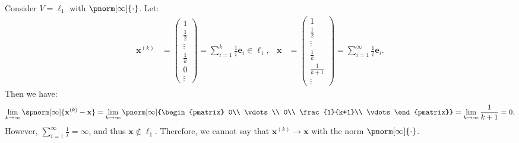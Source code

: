 \documentclass{huhtakm-template-book-v2}
\begin{document}
    \begin{eg}
        Consider $V = \ell_{1}$ with $\pnorm[\infty]{\cdot}$. Let:
        \begin{align*}
            \mathbf{x}^{(k)} &= \begin{pmatrix}
                1\\
                \frac{1}{2}\\
                \vdots\\
                \frac{1}{k}\\
                0\\
                \vdots
            \end{pmatrix}=\sum_{i=1}^{k}\frac{1}{i}\mathbf{e}_{i} \in \ell_{1}, & \mathbf{x} &= \begin{pmatrix}
                1\\
                \frac{1}{2}\\
                \vdots\\
                \frac{1}{k}\\
                \frac{1}{k+1}\\
                \vdots
            \end{pmatrix}=\sum_{i=1}^{\infty}\frac{1}{i}\mathbf{e}_{i}.
        \end{align*}
        Then we have:
        \begin{align*}
            \lim_{k \to \infty}\spnorm[\infty]{\mathbf{x}^{(k)} - \mathbf{x}} = \lim_{k \to \infty}\pnorm[\infty]{\begin{pmatrix}
                    0\\
                    \vdots\\
                    0\\
                    \frac{1}{k+1}\\
                    \vdots
            \end{pmatrix}} = \lim_{k \to \infty}\frac{1}{k+1} = 0.
        \end{align*}
        However, $\sum_{i=1}^{\infty}\frac{1}{i} = \infty$, and thus $\mathbf{x} \not\in \ell_{1}$. Therefore, we cannot say that $\mathbf{x}^{(k)} \to \mathbf{x}$ with the norm $\pnorm[\infty]{\cdot}$.
    \end{eg}
    \newpage
    
\end{document}
